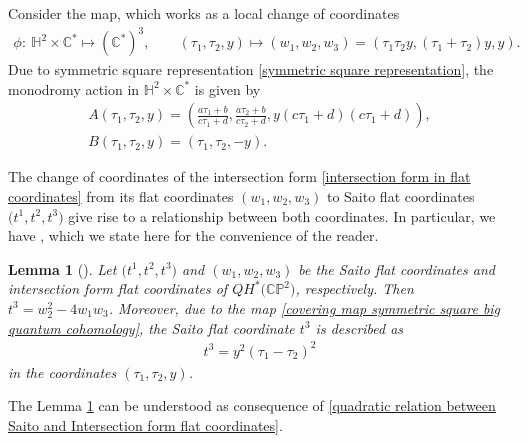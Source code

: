 \documentclass[pdftex]{sigma}
\numberwithin{equation}{section}
\newtheorem{Lemma}[Theorem]{Lemma}
\begin{document}
Consider the map, which works as a local change of coordinates
\begin{gather}
\phi\colon\ \mathbb{H}^2\times \mathbb{C}^{*}\mapsto {(\mathbb{C}^{*})}^3, \qquad (\tau_1,\tau_2,y)\mapsto (w_1,w_2,w_3) =(\tau_1\tau_2y,(\tau_1+\tau_2)y,y).\label{covering map symmetric square big quantum cohomology}
\end{gather}
Due to symmetric square representation \eqref{symmetric square representation}, the monodromy action in $\mathbb{H}^2\times \mathbb{C}^{*}$ is given by
\begin{gather}
A(\tau_1,\tau_2,y)=\left( \frac{a\tau_1+b}{c\tau_1+d}, \frac{a\tau_2+b}{c\tau_2+d}, y(c\tau_1+d)(c\tau_1+d)\right),\nonumber\\
B(\tau_1,\tau_2,y)=(\tau_1,\tau_2,-y).\label{diagonal action of PSL2Z times a1}
\end{gather}

The change of coordinates of the intersection form \eqref{intersection form in flat coordinates} from its flat coordinates $(w_1,w_2,w_3)$ to Saito flat coordinates $\bigl(t^1,t^2,t^3\bigr)$ give rise to a relationship between both coordinates. In particular, we have \cite[Lemma 5.9]{Milanov}, which we state here for the convenience of the reader.

\begin{Lemma}[{\cite{Milanov}}]\label{lemma quadratic relations Milanov}
Let $\bigl(t^1,t^2,t^3\bigr)$ and $(w_1,w_2,w_3)$ be the Saito flat coordinates and intersection form flat coordinates of $QH^{*}\bigl(\mathbb{CP}^2\bigr)$, respectively. Then
$
t^3=w_2^2-4w_1w_3$.
Moreover, due to the map \eqref{covering map symmetric square big quantum cohomology}, the Saito flat coordinate $t^3$ is described as
\begin{gather}\label{t3 change of coordinate 2}
 t^3=y^2(\tau_1-\tau_2 )^2
\end{gather}
in the coordinates $(\tau_1,\tau_2,y)$.
\end{Lemma}

\begin{Remark}
The Lemma \ref{lemma quadratic relations Milanov} can be understood as consequence of \eqref{quadratic relation between Saito and Intersection form flat coordinates}.

\end{Remark}
\end{document}
